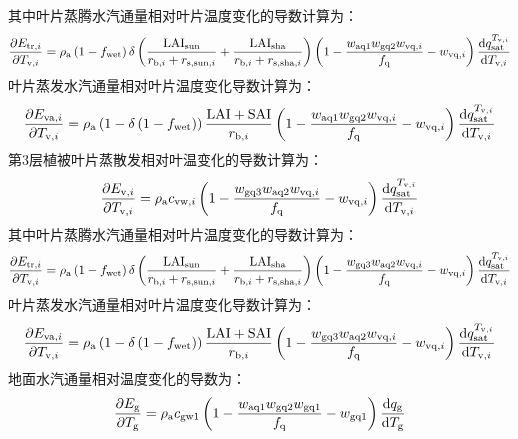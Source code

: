 %
其中叶片蒸腾水汽通量相对叶片温度变化的导数计算为：
\begin{equation}
  \frac{\partial E_{\mathrm{tr},i}}{\partial T_{\mathrm{v},i}} = \rho_{\mathrm{a}}\left( 1 - f_{\mathrm{wet}} \right)\delta\left( \frac{\text{LAI}_{\mathrm{sun}}}{r_{\mathrm{b},i} + r_{\mathrm{s},\mathrm {sun},i}} + \frac{\text{LAI}_{\mathrm{sha}}}{r_{\mathrm{b},i} + r_{\mathrm{s,sha},i}} \right)\left( 1 - \frac{w_{\mathrm{aq1}}w_{\mathrm{gq2}}w_{\mathrm{vq},i}}{f_{\mathrm{q}}} - w_{\mathrm{vq},i} \right)\frac{{\rm d}q_{\mathrm{sat}}^{T_{\mathrm{v},i}}}{{\rm d}T_{\mathrm{v},i}}
\end{equation}
%
叶片蒸发水汽通量相对叶片温度变化导数计算为：
\begin{equation}
  \frac{\partial E_{\mathrm{va},i}}{\partial T_{\mathrm{v},i}} = \rho_{\mathrm{a}}\left( 1 - \delta\left( 1 - f_{\mathrm{wet}} \right) \right)\frac{\text{LAI} + \text{SAI}}{r_{\mathrm{b},i}}\left( 1 - \frac{w_{\mathrm{aq1}}w_{\mathrm{gq2}}w_{\mathrm{vq},i}}{f_{\mathrm{q}}} - w_{\mathrm{vq},i} \right)\frac{{\rm d}q_{\mathrm{sat}}^{T_{\mathrm{v},i}}}{{\rm d}T_{\mathrm{v},i}}
\end{equation}
%
第3层植被叶片蒸散发相对叶温变化的导数计算为：
\begin{equation}
  \frac{\partial E_{\mathrm{v},i}}{\partial T_{\mathrm{v},i}} = \rho_{\mathrm{a}}c_{\mathrm{vw},i}\left( 1 - \frac{w_{\mathrm{gq3}}w_{\mathrm{aq2}}w_{\mathrm{vq},i}}{f_{\mathrm{q}}} - w_{\mathrm{vq},i} \right)\frac{{\rm d}q_{\mathrm{sat}}^{T_{\mathrm{v},i}}}{{\rm d}T_{\mathrm{v},i}}
\end{equation}
%
其中叶片蒸腾水汽通量相对叶片温度变化的导数计算为：
\begin{equation}
  \frac{\partial E_{\mathrm{tr},i}}{\partial T_{\mathrm{v},i}} = \rho_{\mathrm{a}}\left( 1 - f_{\mathrm{wet}} \right)\delta\left( \frac{\text{LAI}_{\mathrm{sun}}}{r_{\mathrm{b},i} + r_{\mathrm{s},\mathrm {sun},i}} + \frac{\text{LAI}_{\mathrm{sha}}}{r_{\mathrm{b},i} + r_{\mathrm{s},\mathrm {sha},i}} \right)\left( 1 - \frac{w_{\mathrm{gq3}}w_{\mathrm{aq2}}w_{\mathrm{vq},i}}{f_{\mathrm{q}}} - w_{\mathrm{vq},i} \right)\frac{{\rm d}q_{\mathrm{sat}}^{T_{\mathrm{v},i}}}{{\rm d}T_{\mathrm{v},i}}
\end{equation}
%
叶片蒸发水汽通量相对叶片温度变化导数计算为：
\begin{equation}
  \frac{\partial E_{\mathrm{va},i}}{\partial T_{\mathrm{v},i}} = \rho_{\mathrm{a}}\left( 1 - \delta\left( 1 - f_{\mathrm{wet}} \right) \right)\frac{\text{LAI} + \text{SAI}}{r_{\mathrm{b},i}}\left( 1 - \frac{w_{\mathrm{gq3}}w_{\mathrm{aq2}}w_{\mathrm{vq},i}}{f_{\mathrm{q}}} - w_{\mathrm{vq},i} \right)\frac{{\rm d}q_{\mathrm{sat}}^{T_{\mathrm{v},i}}}{{\rm d}T_{\mathrm{v},i}}
\end{equation}
%
地面水汽通量相对温度变化的导数为：
\begin{equation}
  \frac{\partial E_{\mathrm{g}}}{\partial T_{\mathrm{g}}} = \rho_{\mathrm{a}}c_{\mathrm{gw1}}\left( 1 - \frac{w_{\mathrm{aq1}}w_{\mathrm{gq2}}w_{\mathrm{gq1}}}{f_{\mathrm {q}}} -w_{\mathrm{gq1}} \right)\frac{{\rm d}q_{\mathrm{g}}}{{\rm d}T_{\mathrm{g}}}
\end{equation}

